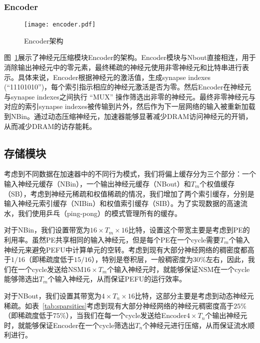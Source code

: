 \subsubsection{Encoder}

\begin{figure}[h]
\centering
\texttt{[image: encoder.pdf]}
\caption{Encoder架构}
\label{fig:encoder}
\end{figure}

图~\ref{fig:encoder}展示了神经元压缩模块Encoder的架构。Encoder模块与Nbout直接相连，用于消除输出神经元中的零元素，最终稀疏的神经元使用非零神经元和比特串进行表示。具体来说，Encoder根据神经元的激活值，生成synapse indexes (“11101010”)，每个索引指示相应的神经元激活是否为零。然后Encoder在神经元与synapse indexes之间执行 “MUX” 操作筛选出非零的神经元。最终非零神经元与对应的索引synapse indexes被传输到片外，然后作为下一层网络的输入被重新加载到NBin。通过动态压缩神经元，加速器能够显著减少DRAM访问神经元的开销，从而减少DRAM的访存能耗。

\subsection{存储模块}
\label{subsec:storage}

考虑到不同数据在加速器中的不同行为模式，我们将偏上缓存分为三个部分：一个输入神经元缓存（NBin），一个输出神经元缓存（NBout）和$T_m$个权值缓存（SB），考虑到神经元稀疏和权值稀疏的情况，我们增加了两个索引缓存，分别是输入神经元索引缓存（NIBin）和权值索引缓存（SIB）。为了实现数据的高速流水，我们使用乒乓（ping-pong）的模式管理所有的缓存。

对于NBin，我们设置带宽为$16\times T_m \times 16$比特，设置这个带宽主要是考虑到PE的利用率。虽然PE共享相同的输入神经元，但是每个PE在一个cycle需要$T_m$个输入神经元来避免PEFU中计算单元的空转。考虑到现有大部分神经网络的稠密度都高于$1/16$（即稀疏度低于$15/16$），特别是卷积层，一般稠密度为$30\%$左右，因此，我们在一个cycle发送给NSM$16\times T_m$个输入神经元时，就能够保证NSM在一个cycle能够筛选出$T_m$个输入神经元，从而保证PEFU的运行效率。

对于NBout，我们设置其带宽为$4\times T_n \times 16$比特，这部分主要是考虑到动态神经元稀疏。如表~\ref{tab:sparsities}考虑到现有大部分神经网络的神经元稠密度高于$25\%$（即稀疏度低于$75\%$），当我们在每一个cycle发送给Encoder$4\times T_n$个输出神经元时，就能够保证Encoder在一个cycle筛选出$T_n$个神经元进行压缩，从而保证流水顺利进行。

